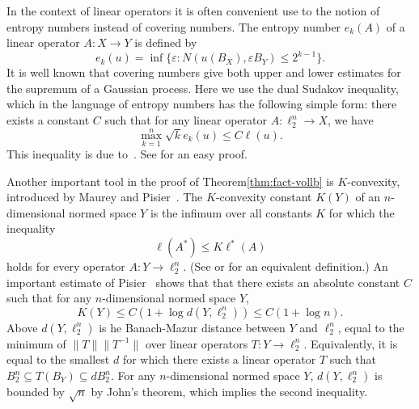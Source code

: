 \documentclass[11pt]{article}
\begin{document}
In the context of linear operators it is often convenient use to the
notion of entropy numbers instead of covering numbers.  The entropy
number $e_k(A)$ of a linear operator $A:X \to Y$ is defined by
\[
e_k(u) = \inf\{\varepsilon: N(u(B_X), \varepsilon B_Y) \le 2^{k-1}\}. 
\]
It is well known that covering numbers give both upper and lower
estimates for the supremum of a Gaussian process. Here we use the dual
Sudakov inequality, which in the language of entropy numbers has the
following simple form: there exists a constant $C$ such that for any
linear operator $A:\ell_2^n \to X$, we have
\begin{equation}
  \label{eq:sudakov}
  \max_{k = 1}^n \sqrt{k}e_k(u) \le C\ell(u). 
\end{equation}
This inequality is due to~\cite{PTJ85}. See \cite[Section
3.3]{LT91-book} for an easy proof. 

Another important tool in the proof of Theorem\ref{thm:fact-vollb} is
$K$-convexity, introduced by Maurey and Pisier~\cite{MP76}. The
$K$-convexity constant $K(Y)$ of an $n$-dimensional normed space $Y$
is the infimum over all constants $K$ for which the inequality
\begin{equation}
  \label{eq:K-conv-def}
\ell(A^*) \le K\ell^*(A)
\end{equation}
holds for every operator $A:Y \to \ell_2^n$. (See
\cite{Pisier-book} or \cite{TJ-book} for an equivalent definition.)
An important estimate of Pisier~\cite{P80} shows that that there
exists an absolute constant $C$ such that for any $n$-dimensional
normed space $Y$, 
\begin{equation}
  \label{eq:K-conv-Pisier}
  K(Y) \le C(1+\log d(Y,\ell_2^n))\le C(1+\log n).
\end{equation}
Above $d(Y, \ell_2^n)$ is he Banach-Mazur distance between $Y$ and
$\ell_2^n$, equal to the minimum of $\|T\| \|T^{-1}\|$ over linear
operators $T:Y \to \ell_2^n$. Equivalently, it is equal to the
smallest $d$ for which there exists a linear operator $T$ such that
$B_2^n \subseteq T(B_Y) \subseteq d B_2^n$. For any $n$-dimensional
normed space $Y$, $d(Y,\ell_2^n)$ is bounded by $\sqrt{n}$ by John's
theorem, which implies the second inequality.
\end{document}
